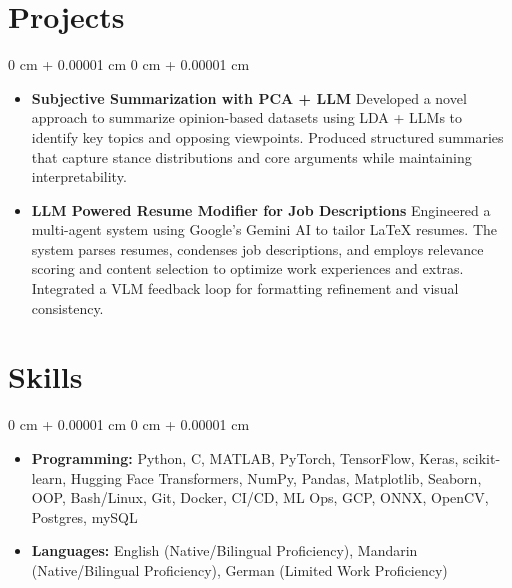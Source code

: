 \documentclass[11pt, letterpaper]{article}
\newenvironment{highlights}{
    \begin{itemize}[
        topsep=0.08 cm,
        parsep=0.08 cm,
        partopsep=0pt,
        itemsep=0pt,
        leftmargin=0.2 cm + 17pt
    ]
}
{
    \end{itemize}
}
\newenvironment{onecolentry}{
    \begin{adjustwidth}{
        0 cm + 0.00001 cm
    }{
        0 cm + 0.00001 cm
    }
}{
    \end{adjustwidth}
}
\begin{document}
\section{Projects}
\vspace{0.08 cm}
\begin{onecolentry}
    \begin{highlights}
        \item \textbf{Subjective Summarization with PCA + LLM} Developed a novel approach to summarize opinion-based datasets using LDA + LLMs to identify key topics and opposing viewpoints. Produced structured summaries that capture stance distributions and core arguments while maintaining interpretability.
        \item \textbf{LLM Powered Resume Modifier for Job Descriptions} Engineered a multi-agent system using Google's Gemini AI to tailor LaTeX resumes. The system parses resumes, condenses job descriptions, and employs relevance scoring and content selection to optimize work experiences and extras. Integrated a VLM feedback loop for formatting refinement and visual consistency.
    \end{highlights}
\end{onecolentry}

\section{Skills}
\vspace{0.08 cm}
\begin{onecolentry}
    \begin{highlights}
        \item \textbf{Programming:} Python, C, MATLAB, PyTorch, TensorFlow, Keras, scikit-learn, Hugging Face Transformers, NumPy, Pandas, Matplotlib, Seaborn, OOP, Bash/Linux, Git, Docker, CI/CD, ML Ops, GCP, ONNX, OpenCV, Postgres, mySQL
        \item \textbf{Languages:} English (Native/Bilingual Proficiency), Mandarin (Native/Bilingual Proficiency), German (Limited Work Proficiency)
    \end{highlights}
\end{onecolentry}
\end{document}

